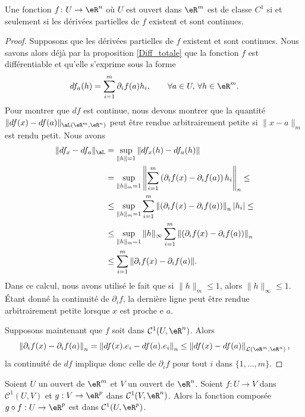 \begin{proposition}		\label{PropDerContCun}
	Une fonction \( f\colon U\to \eR^n\) où \( U\) est ouvert dans \( \eR^m\) est de classe \( C^1\) si et seulement si les dérivées partielles de $f$ existent et sont continues.
\end{proposition}

\begin{proof}
	Supposons que les dérivées partielles de $f$ existent et sont continues. Nous savons alors déjà par la proposition \ref{Diff_totale} que la fonction $f$ est différentiable et qu'elle s'exprime sous la forme
	\[
		df_a(h)=\sum_{i=1}^{m}\partial_if (a)h_i, \qquad \forall a \in U,\,\forall h\in\eR^m.
	\]
	Pour montrer que $df$ est continue, nous devons montrer que la quantité $\| df(x)-df(a) \|_{\aL(\eR^m,\eR^n)}$ peut être rendue arbitrairement petite si $\| x-a \|_m$ est rendu petit. Nous avons
	\begin{equation}
		\begin{aligned}
			\| df_x-df_a \|_{\aL}&=\sup_{\| h \|=1}\| df_x(h)-df_a(h) \|\\
			&=\sup_{\| h \|_m=1}\left\|\sum_{i=1}^{m}\left(\partial_if (x)-\partial_if (a)\right)h_i\right\|_n\leq\\
			&\leq\sup_{\| h \|_m=1}\sum_{i=1}^{m} \left\|\left(\partial_if (x)-\partial_if (a)\right)\right\|_n|h_i|\leq\\
			&\leq\sup_{\| h \|_m=1} \|h\|_\infty\sum_{i=1}^{m} \left\|\left(\partial_if (x)-\partial_if (a)\right)\right\|_n\\
			&\leq \sum_{i=1}^m\| \partial_if(x)-\partial_if(a) \|.
		\end{aligned}
	\end{equation}
	Dans ce calcul, nous avons utilisé le fait que si $\| h \|_m\leq 1$, alors $\| h \|_{\infty}\leq 1$. Étant donné la continuité de $\partial_if$, la dernière ligne peut être rendue arbitrairement petite lorsque $x$ est proche e $a$.

Supposons maintenant que $f$ soit dans $\mathcal{C}^1(U,\eR^n)$. Alors 
\[
\left\|\partial_if (x)-\partial_if (a)\right\|_n= \left\|df(x).e_i-df(a).e_i\right\|_n \leq  \left\|df(x)-df(a)\right\|_{\mathcal{L}(\eR^m,\eR^n)},
\]  
la continuité de $df$ implique donc celle de $\partial_i f$ pour tout $i$ dans $\{1,\ldots,m\}$.
\end{proof}
\begin{proposition}
  Soient $U$ un ouvert de $\eR^m$ et $V$ un ouvert de $\eR^n$. Soient $f: U\to V$  dans $\mathcal{C}^1(U,V)$ et $g: V \to \eR^p$ dans $\mathcal{C}^1(V,\eR^n)$.  Alors la fonction composée $g\circ f: U\to \eR^p $ est dans $\mathcal{C}^1(U,\eR^p)$.
\end{proposition}

